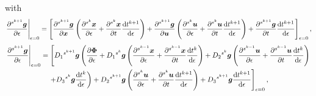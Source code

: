\documentclass[../DC2019003Bouma.tex]{subfiles}
\begin{document}
with
\begin{align}
\left.\frac{\partial\hspace{0cm}^{s^{k+1}}{\boldsymbol{g}}}{\partial\epsilon}\right|_{\epsilon=0} = \left[\frac{\partial\hspace{0cm}^{s^{k+1}}{\boldsymbol{g}}}{\partial{\boldsymbol{x}}}\left(\frac{\partial\hspace{0cm}^{s^k}{\boldsymbol{x}}}{\partial\epsilon} + \frac{\partial\hspace{0cm}^{s^k}{\boldsymbol{x}}}{\partial t}\frac{\text{d} t^{k+1}}{\text{d}\epsilon}\right) + \frac{\partial\hspace{0cm}^{s^{k+1}}{\boldsymbol{g}}}{\partial{\boldsymbol{u}}}\left(\frac{\partial\hspace{0cm}^{s^k}{\boldsymbol{u}}}{\partial\epsilon} + \frac{\partial\hspace{0cm}^{s^k}{\boldsymbol{u}}}{\partial t}\frac{\text{d} t^{k+1}}{\text{d}\epsilon}\right) + \frac{\partial\hspace{0cm}^{s^{k+1}}{\boldsymbol{g}}}{\partial t}\frac{\text{d} t^{k+1}}{\text{d}\epsilon}\right]_{\epsilon=0},
\end{align}
\begin{multline}
\left.\frac{\partial\hspace{0cm}^{s^{k+1}}{\boldsymbol{g}}}{\partial\epsilon}\right|_{\epsilon=0} = \left[D_1\hspace{0cm}^{s^{k+1}}{\boldsymbol{g}}\left(\frac{\partial \boldsymbol{\Phi}}{\partial\epsilon} + D_1\hspace{0cm}^{s^{k}}{\boldsymbol{g}}\left(\frac{\partial\hspace{0cm}^{s^{k-1}}{\boldsymbol{x}}}{\partial\epsilon} + \frac{\partial\hspace{0cm}^{s^{k-1}}{\boldsymbol{x}}}{\partial t}\frac{\text{d}t^{k}}{\text{d}\epsilon}\right) + D_2\hspace{0cm}^{s^{k}}{\boldsymbol{g}}\left(\frac{\partial\hspace{0cm}^{s^{k-1}}{\boldsymbol{u}}}{\partial\epsilon} + \frac{\partial\hspace{0cm}^{s^{k-1}}{\boldsymbol{u}}}{\partial t}\frac{\text{d} t^{k}}{\text{d}\epsilon}\right)\right.\right.\\\left.\left. + D_3\hspace{0cm}^{s^{k}}{\boldsymbol{g}}\frac{\text{d} t^k}{\text{d} \epsilon} \right) + D_2\hspace{0cm}^{s^{k+1}}{\boldsymbol{g}}\left(\frac{\partial\hspace{0cm}^{s^k}{\boldsymbol{u}}}{\partial\epsilon} + \frac{\partial\hspace{0cm}^{s^k}{\boldsymbol{u}}}{\partial t}\frac{\text{d} t^{k+1}}{\text{d}\epsilon}\right) + D_3\hspace{0cm}^{s^{k+1}}{\boldsymbol{g}}\frac{\text{d} t^{k+1}}{\text{d}\epsilon}\right]_{\epsilon=0},
\end{multline}

\end{document}
